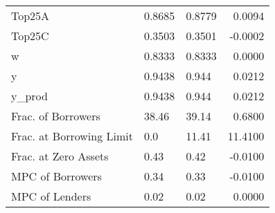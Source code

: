 \begin{table}
\begin{tabular}{lllr}
                  Top25A &  0.8685 &   0.8779 &  0.0094 \\
                  Top25C &  0.3503 &   0.3501 & -0.0002 \\
                       w &  0.8333 &   0.8333 &  0.0000 \\
                       y &  0.9438 &    0.944 &  0.0212 \\
                  y\_prod &  0.9438 &    0.944 &  0.0212 \\
      Frac. of Borrowers &   38.46 &    39.14 &  0.6800 \\
Frac. at Borrowing Limit &     0.0 &    11.41 & 11.4100 \\
    Frac. at Zero Assets &    0.43 &     0.42 & -0.0100 \\
        MPC of Borrowers &    0.34 &     0.33 & -0.0100 \\
          MPC of Lenders &    0.02 &     0.02 &  0.0000 \\
\bottomrule
\end{tabular}
\end{table}
